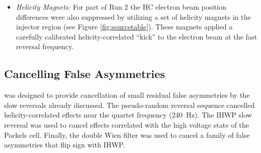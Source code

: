 \begin{itemize}
To check that no helicity-correlated signals were getting to the DAQ electronics a battery was connected to one of the channels being read out. Since the battery signal was read through the same \Qs electronics chain as the physics measurement, any asymmetry on that channel would be the signal of a false asymmetry from electronics pickup. Figure \ref{fig:battery_asym} shows the asymmetry of the battery for a typical run.
\begin{figure}[ht]
\centering
{}
\caption{Asymmetry of a 6V battery for a typical run as read out by the \Qs DAQ electronics.}
\label{fig:battery_asym}

\end{figure}

\item {\it Helicity Magnets:} For part of Run 2 the HC electron beam position differences were also suppressed by utilizing a set of helicity magnets in the injector region (see Figure \ref{fig:sourcetable}). These magnets applied a carefully calibrated helicity-correlated ``kick'' to the electron beam at the fast reversal frequency.  

\end{itemize}  
 
\subsection{Cancelling False Asymmetries}   
\Qs was designed to provide cancellation of small residual false asymmetries by the slow reversals already discussed. The pseudo-random reversal sequence cancelled helicity-correlated effects near the quartet frequency (240~Hz). The IHWP slow reversal was used to cancel effects correlated with the high voltage state of the Pockels cell. Finally, the double Wien filter was used to cancel a family of false asymmetries that flip sign with IHWP.

